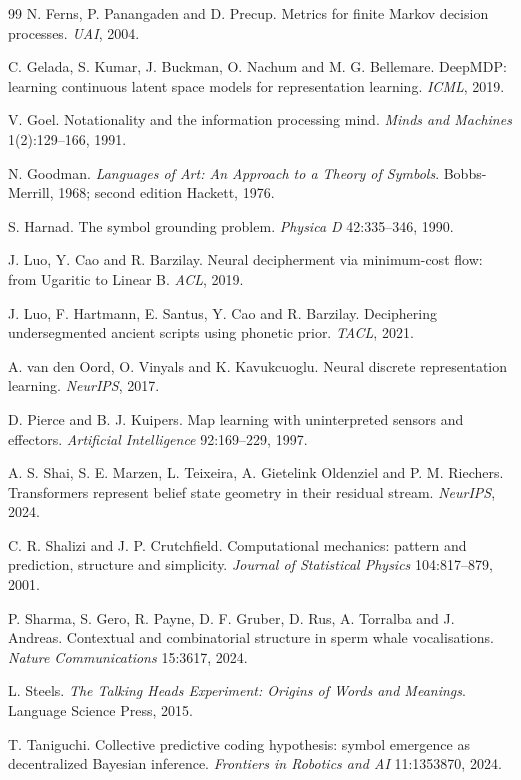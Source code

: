 \begin{thebibliography}{99}
 N. Ferns, P. Panangaden and D. Precup. Metrics for finite Markov
decision processes. \emph{UAI}, 2004.

 C. Gelada, S. Kumar, J. Buckman, O. Nachum and M. G. Bellemare.
DeepMDP: learning continuous latent space models for representation learning.
\emph{ICML}, 2019.

 V. Goel. Notationality and the information processing mind.
\emph{Minds and Machines} 1(2):129--166, 1991.

 N. Goodman. \emph{Languages of Art: An Approach to a Theory of
Symbols}. Bobbs-Merrill, 1968; second edition Hackett, 1976.

 S. Harnad. The symbol grounding problem. \emph{Physica D}
42:335--346, 1990.

 J. Luo, Y. Cao and R. Barzilay. Neural decipherment via minimum-cost
flow: from Ugaritic to Linear B. \emph{ACL}, 2019.

 J. Luo, F. Hartmann, E. Santus, Y. Cao and R. Barzilay. Deciphering
undersegmented ancient scripts using phonetic prior. \emph{TACL}, 2021.

 A. van den Oord, O. Vinyals and K. Kavukcuoglu. Neural discrete
representation learning. \emph{NeurIPS}, 2017.

 D. Pierce and B. J. Kuipers. Map learning with uninterpreted sensors
and effectors. \emph{Artificial Intelligence} 92:169--229, 1997.

 A. S. Shai, S. E. Marzen, L. Teixeira, A. Gietelink Oldenziel and
P. M. Riechers. Transformers represent belief state geometry in their residual stream.
\emph{NeurIPS}, 2024.

 C. R. Shalizi and J. P. Crutchfield. Computational mechanics:
pattern and prediction, structure and simplicity. \emph{Journal of Statistical Physics}
104:817--879, 2001.

 P. Sharma, S. Gero, R. Payne, D. F. Gruber, D. Rus, A. Torralba and
J. Andreas. Contextual and combinatorial structure in sperm whale vocalisations.
\emph{Nature Communications} 15:3617, 2024.

 L. Steels. \emph{The Talking Heads Experiment: Origins of Words and
Meanings}. Language Science Press, 2015.

 T. Taniguchi. Collective predictive coding hypothesis: symbol
emergence as decentralized Bayesian inference. \emph{Frontiers in Robotics and AI}
11:1353870, 2024.


\end{thebibliography}
